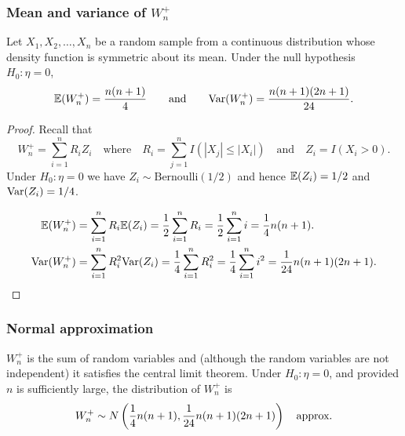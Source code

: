 \subsubsection{Mean and variance of $W^{+}_n$}

\begin{theorem}
Let $X_1,X_2,\ldots,X_n$ be a random sample from a continuous distribution whose density function is symmetric about its mean. Under the null hypothesis $H_0:\eta=0$, 
\[
\mathbb{E}(W^{+}_n) = \frac{n(n+1)}{4} \qquad\text{and}\qquad \text{Var}(W^{+}_n)	= \frac{n(n+1)(2n+1)}{24}.
\]
\end{theorem}

\begin{proof}
Recall that 
\[
W^{+}_n = \sum_{i=1}^n R_i Z_i \quad\text{where}\quad R_i = \sum_{j=1}^n I(|X_j|\leq |X_i|) \quad\text{and}\quad Z_i=I(X_i>0).
\]
%
Under $H_0:\eta=0$ we have $Z_i\sim\text{Bernoulli}(1/2)$ and hence $\mathbb{E}(Z_i)=1/2$ and $\text{Var}(Z_i)=1/4$. 

\begin{align*}
\mathbb{E}(W^{+}_n) 
	& = \sum_{i=1}^n R_i\mathbb{E}(Z_i) 
	= \frac{1}{2}\sum_{i=1}^n R_i
	= \frac{1}{2}\sum_{i=1}^n i
	= \frac{1}{4}n(n+1). \\
\text{Var}(W^{+}_n)
	& = \sum_{i=1}^n R_i^2 \text{Var}(Z_i) 
	= \frac{1}{4}\sum_{i=1}^n R_i^2
	= \frac{1}{4}\sum_{i=1}^n i^2
	= \frac{1}{24}n(n+1)(2n+1).
\end{align*}
\end{proof}


\subsubsection{Normal approximation}
$W^{+}_n$ is the sum of random variables and (although the random variables are not independent) it satisfies the central limit theorem. Under $H_0:\eta=0$, and provided $n$ is sufficiently large, the distribution of $W^{+}_n$ is 
\[
W^{+}_n \sim N\left(\frac{1}{4}n(n+1), \frac{1}{24}n(n+1)(2n+1)\right) \text{\quad approx.}
\]

